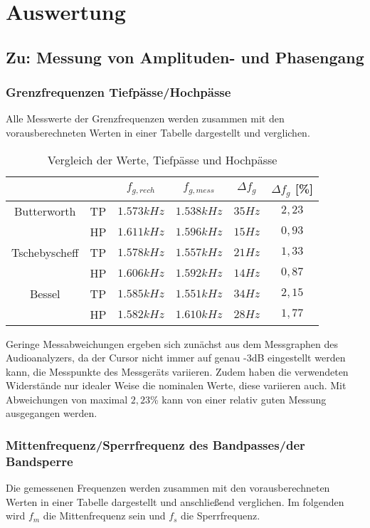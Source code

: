 \section{Auswertung}
\subsection{Zu: Messung von Amplituden- und Phasengang}
\subsubsection{Grenzfrequenzen Tiefpässe/Hochpässe}
\noindent Alle Messwerte der Grenzfrequenzen werden zusammen mit den vorausberechneten Werten in einer Tabelle dargestellt und verglichen.
   	  
   	  \begin{table}[h]
   	  	\centering
   	  	\begin{tabular}{c|c|c|c|c|c|}
						   	&	& $f_{g,rech}$	& $f_{g,mess}$	& $\Delta f_g$	& $\Delta f_g$ [\%] \\
   	  		\hline
   	  		Butterworth		& TP& $1.573kHz$	& $1.538kHz$	& $35Hz$		& $2,23$\\
							& HP& $1.611kHz$	& $1.596kHz$	& $15Hz$		& $0,93$\\
			\hline
   	  		Tschebyscheff	& TP& $1.578kHz$	& $1.557kHz$	& $21Hz$		& $1,33$\\
				   	  		& HP& $1.606kHz$	& $1.592kHz$	& $14Hz$		& $0,87$\\
   	  		\hline
   	  		Bessel			& TP& $1.585kHz$	& $1.551kHz$	& $34Hz$		& $2,15$\\
				   	  		& HP& $1.582kHz$	& $1.610kHz$	& $28Hz$		& $1,77$
   	  	\end{tabular}
		\caption{Vergleich der Werte, Tiefpässe und Hochpässe}
		\label{tab:grenzfrequnzen_hp_tp_vorausberechnung}
   	  \end{table}
   	  
   	  \noindent Geringe Messabweichungen ergeben sich zunächst aus dem Messgraphen des Audioanalyzers, da der Cursor nicht immer auf genau -3dB eingestellt werden kann, die Messpunkte des Messgeräts variieren. Zudem haben die verwendeten Widerstände nur idealer Weise die nominalen Werte, diese variieren auch. Mit Abweichungen von maximal $2,23$\% kann von einer relativ guten Messung ausgegangen werden.
   	  

\subsubsection{Mittenfrequenz/Sperrfrequenz des Bandpasses/der Bandsperre}
\noindent Die gemessenen Frequenzen werden zusammen mit den vorausberechneten Werten in einer Tabelle dargestellt und anschließend verglichen. Im folgenden wird $f_m$ die Mittenfrequenz sein und $f_s$ die Sperrfrequenz.

